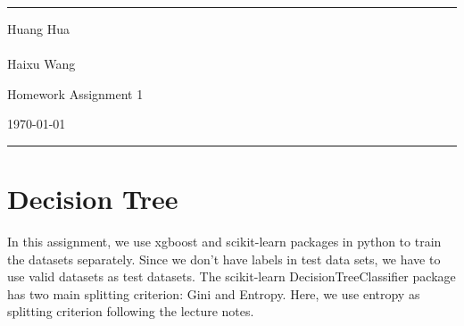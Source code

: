 \documentclass[a4paper]{article}
\begin{document}
\fancyhead[C]{}
\hrule \medskip %
\begin{minipage}{0.295\textwidth} 
\raggedright
\footnotesize
Huang Hua \hfill\\   
\textbf{}\\
Haixu Wang\hfill\\

\end{minipage}
\begin{minipage}{0.4\textwidth} 
\centering 
\large 
Homework Assignment 1\\ 
\end{minipage}
\begin{minipage}{0.295\textwidth} 
\raggedleft
\today\hfill\\
\end{minipage}
\medskip\hrule 
\bigskip


\section{Decision Tree}
In this assignment, we use xgboost and scikit-learn packages in python to train the datasets separately. Since we don't have labels in test data sets, we have to use valid datasets as test datasets. The scikit-learn DecisionTreeClassifier package has two main splitting criterion: Gini and Entropy. Here, we use entropy as splitting criterion following the lecture notes.
\end{document}

